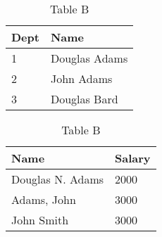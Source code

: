 \begin{table}[!htb]
    \caption{Example of a join problem}
    \begin{subtable}{.5\linewidth}
      \centering
        \caption{Table A}
        \begin{tabular}{|l|l|}
          \hline
           Dept & Name \\
           \hline
           1    & Douglas Adams \\
           2    & John Adams \\
           3  & Douglas Bard \\
           \hline
        \end{tabular}
    \end{subtable}%
    \begin{subtable}{.5\linewidth}
      \centering
        \caption{Table B}
        \begin{tabular}{|l|l|}
          \hline
           Name & Salary \\
           \hline
           Douglas N. Adams & 2000 \\
           Adams, John & 3000 \\
           John Smith & 3000 \\
           \hline
        \end{tabular}
    \end{subtable}
    \label{table-example}
\end{table}

